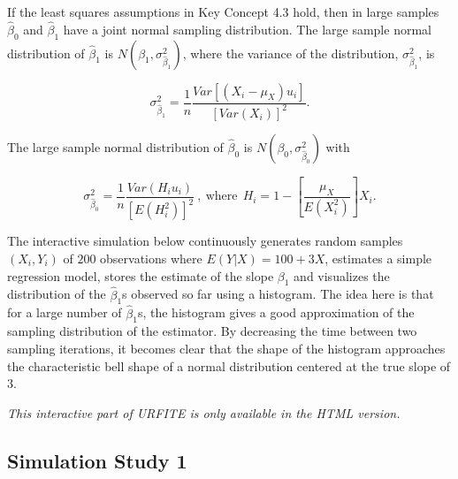 \documentclass[]{book}
\theoremstyle{definition}
\theoremstyle{definition}
\theoremstyle{definition}
\theoremstyle{remark}
\begin{document}
\begin{keyconcepts}{4.4}
If the least squares assumptions in Key Concept 4.3 hold, then in large samples $\hat\beta_0$ and $\hat\beta_1$ have a joint normal sampling distribution. The large sample normal distribution of $\hat\beta_1$ is $N(\beta_1, \sigma^2_{\hat\beta_1})$, where the variance of the distribution, $\sigma^2_{\hat\beta_1}$, is 

\begin{equation}
\sigma^2_{\hat\beta_1} = \frac{1}{n} \frac{Var \left[ \left(X_i - \mu_X \right) u_i  \right]}  {\left[  Var \left(X_i \right)  \right]^2}.
\end{equation}

The large sample normal distribution of $\hat\beta_0$ is $N(\beta_0, \sigma^2_{\hat\beta_0})$ with

\begin{equation}
\sigma^2_{\hat\beta_0} =  \frac{1}{n} \frac{Var \left( H_i u_i \right)}{ \left[  E \left(H_i^2  \right)  \right]^2 } \ , \ \text{where} \ \ H_i = 1 - \left[ \frac{\mu_X} {E \left( X_i^2\right)} \right] X_i.
\end{equation}

The interactive simulation below continuously generates random samples $(X_i,Y_i)$ of $200$ observations where $E(Y\vert X) = 100 + 3X$, estimates a simple regression model, stores the estimate of the slope $\beta_1$ and visualizes the distribution of the $\widehat{\beta}_1$s observed so far using a histogram. The idea here is that for a large number of $\widehat{\beta}_1$s, the histogram gives a good approximation of the sampling distribution of the estimator. By decreasing the time between two sampling iterations, it becomes clear that the shape of the histogram approaches the characteristic bell shape of a normal distribution centered at the true slope of $3$.\vspace{0.5cm}

\begin{center}\textit{This interactive part of URFITE is only available in the HTML version.}\end{center}

\end{keyconcepts}

\subsection*{Simulation Study 1}\label{simulation-study-1}
\end{document}
